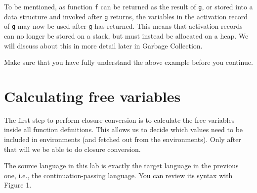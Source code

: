 \documentclass{article}
\theoremstyle{definition}
\theoremstyle{remark}
\numberwithin{equation}{section}
\begin{document}
To be mentioned, as function \texttt{f} can be returned as the result of \texttt{g},
or stored into a data structure and invoked after \texttt{g} returns,
the variables in the activation record of \texttt{g}
may now be used after \texttt{g} has returned. This means that activation records
can no longer be stored on a stack, but must instead be allocated on a heap.
We will discuss about this in more detail later in Garbage Collection.

Make sure that you have fully understand the above example before you continue.\\

\section{Calculating free variables}

The first step to perform closure conversion is to calculate the free variables
inside all function definitions. This allows us to decide which values need to be
 included in environments (and fetched out from the environments). Only
 after that will we be able to do closure conversion.

The source language in this lab is exactly the target language in the previous one,
 i.e., the continuation-passing language. You can review its syntax with Figure 1.
\end{document}
